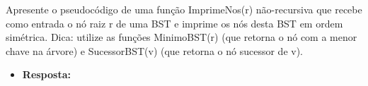 Apresente o pseudocódigo de uma função ImprimeNos(r) não-recursiva que recebe como
entrada o nó raiz r de uma BST e imprime os nós desta BST em ordem simétrica.
Dica: utilize as funções MinimoBST(r) (que retorna o nó com a menor chave na árvore) e
SucessorBST(v) (que retorna o nó sucessor de v).

\begin{itemize}
	\item \textbf{Resposta:}
\end{itemize}